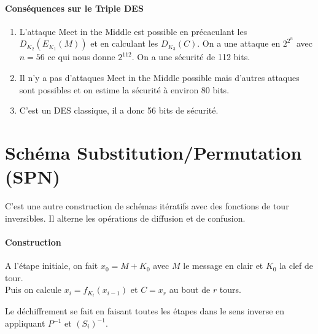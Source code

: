 \documentclass[12pt,a4paper]{report}
\begin{document}
\paragraph{Conséquences sur le Triple DES\\}
\begin{enumerate}
\item L'attaque Meet in the Middle est possible en précaculant les $D_{K_2}(E_{K_1}(M))$ et en calculant les $D_{K_3}(C)$. On a une attaque en $2^{2^n}$ avec $n = 56$ ce qui nous donne $2^{112}$. On a une sécurité de 112 bits.
\item Il n'y a pas d'attaques Meet in the Middle possible mais d'autres attaques sont possibles et on estime la sécurité à environ 80 bits.
\item C'est un DES classique, il a donc 56 bits de sécurité.
\end{enumerate}
\section{Schéma Substitution/Permutation (SPN)} 
C'est une autre construction de schémas itératifs avec des fonctions de tour inversibles. Il alterne les opérations de diffusion et de confusion.
\paragraph{Construction\\}
A l'étape initiale, on fait $x_0 = M + K_0$ avec $M$ le message en clair et $K_0$ la clef de tour.\\
Puis on calcule $x_i = f_{K_i}(x_{i-1})$ et $C=x_r$ au bout de $r$ tours.
\begin{center}
  \scalebox{0.6}{}	
\end{center}

Le déchiffrement se fait en faisant toutes les étapes dans le sens inverse en appliquant $P^{-1}$ et $(S_i)^{-1}$.
\end{document}
